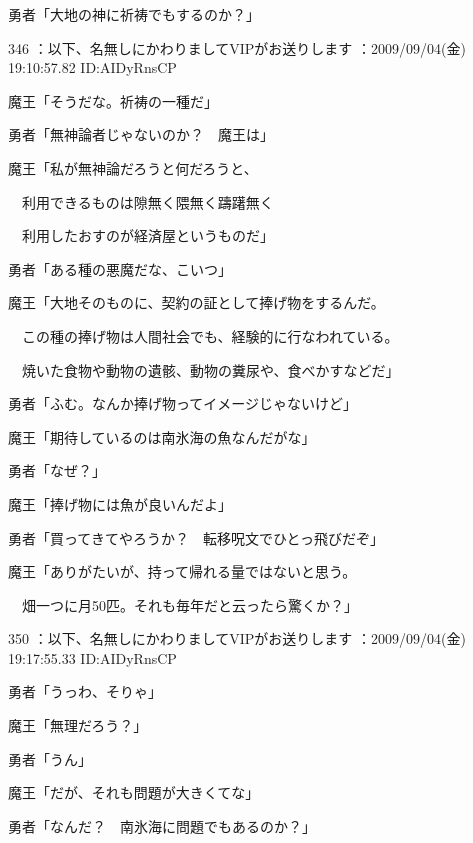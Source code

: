 \documentclass[a4j,twocolumn]{tarticle}
\begin{document}
勇者「大地の神に祈祷でもするのか？」 

	
    
    

346 ：以下、名無しにかわりましてVIPがお送りします ：2009/09/04(金) 19:10:57.82 ID:AIDyRnsCP 


魔王「そうだな。祈祷の一種だ」\par{} 
勇者「無神論者じゃないのか？　魔王は」 



魔王「私が無神論だろうと何だろうと、\par{} 
　利用できるものは隙無く隈無く躊躇無く\par{} 
　利用したおすのが経済屋というものだ」\par{} 
勇者「ある種の悪魔だな、こいつ」 



魔王「大地そのものに、契約の証として捧げ物をするんだ。\par{} 
　この種の捧げ物は人間社会でも、経験的に行なわれている。\par{} 
　焼いた食物や動物の遺骸、動物の糞尿や、食べかすなどだ」\par{} 
勇者「ふむ。なんか捧げ物ってイメージじゃないけど」 



魔王「期待しているのは南氷海の魚なんだがな」\par{} 
勇者「なぜ？」 



魔王「捧げ物には魚が良いんだよ」\par{} 
勇者「買ってきてやろうか？　転移呪文でひとっ飛びだぞ」 



魔王「ありがたいが、持って帰れる量ではないと思う。\par{} 
　畑一つに月50匹。それも毎年だと云ったら驚くか？」 

	
    
    

350 ：以下、名無しにかわりましてVIPがお送りします ：2009/09/04(金) 19:17:55.33 ID:AIDyRnsCP 


勇者「うっわ、そりゃ」\par{} 
魔王「無理だろう？」\par{} 
勇者「うん」 



魔王「だが、それも問題が大きくてな」\par{} 
勇者「なんだ？　南氷海に問題でもあるのか？」 
\end{document}
